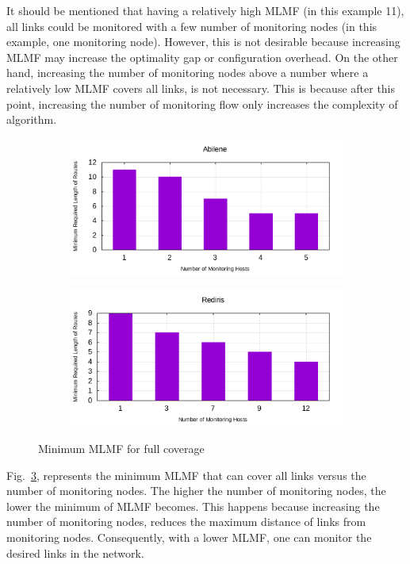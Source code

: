 \documentclass[10pt, journal, letterpaper]{IEEEtran}
\begin{document}
It should be mentioned that having a relatively high MLMF (in this example 11), all links could be monitored with a few number of monitoring nodes (in this example, one monitoring node). However, this is not desirable because increasing MLMF may increase the optimality gap or configuration overhead. On the other hand, increasing the number of monitoring nodes above a number where a relatively low MLMF covers all links, is not necessary. This is because after this point, increasing the number of monitoring flow only increases the complexity of algorithm. 
\begin{figure}
    \begin{subfigure}{0.49\columnwidth}
       \centering
        \includegraphics[width=\columnwidth]{img/eval_Abilene_bar_min_length_of_routes_with_different_monitoring_nodes.png}
        \label{fig:ABI_bar_min_MLMF_full_cover}
    \end{subfigure}
    \begin{subfigure}{0.49\columnwidth}
      \centering
      \includegraphics[width=\columnwidth]{img/eval_Rediris_bar_min_length_of_routes_with_different_monitoring_nodes.png}
     \label{fig:RED_bar_min_MLMF_full_cover}
    \end{subfigure}
    \caption{Minimum MLMF for full coverage}
    \label{fig:bar_min_MLMF_full_cover}
\end{figure}
Fig.~\ref{fig:bar_min_MLMF_full_cover}, represents the minimum MLMF that can cover all links versus the number of monitoring nodes. The higher the number of monitoring nodes, the lower the minimum of MLMF becomes. This happens because increasing the number of monitoring nodes, reduces the maximum distance of links from monitoring nodes. Consequently, with a lower MLMF, one can monitor the desired links in the network. %
\end{document}
